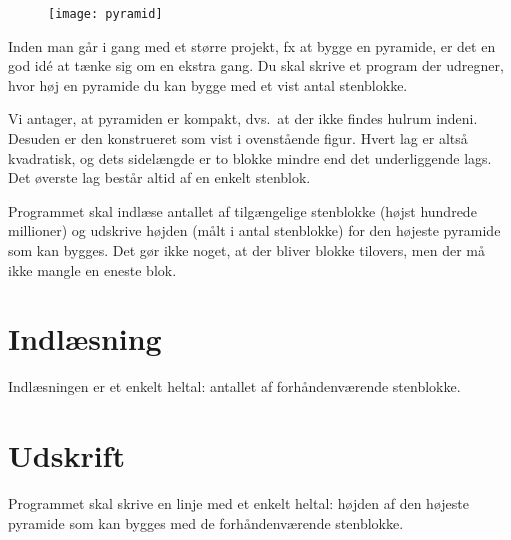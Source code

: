 
\begin{figure}[h!]
  \centering
  \texttt{[image: pyramid]}
\end{figure}

Inden man går i gang med et større projekt, fx at bygge en pyramide, er det en god idé at tænke sig om en ekstra gang.
Du skal skrive et program der udregner, hvor høj en pyramide du kan bygge med et vist antal stenblokke.

Vi antager, at pyramiden er kompakt, dvs.\ at der ikke findes hulrum indeni.
Desuden er den konstrueret som vist i ovenstående figur.
Hvert lag er altså kvadratisk, og dets sidelængde er to blokke mindre end det underliggende lags.
Det øverste lag består altid af en enkelt stenblok.

Programmet skal indlæse antallet af tilgængelige stenblokke (højst hundrede millioner) og udskrive højden (målt i antal stenblokke) for den højeste pyramide som kan bygges.
Det gør ikke noget, at der bliver blokke tilovers, men der må ikke mangle en eneste blok.

\section*{Indlæsning}
Indlæsningen er et enkelt heltal: antallet af forhåndenværende stenblokke.

\section*{Udskrift}
Programmet skal skrive en linje med et enkelt heltal: højden af den højeste pyramide som kan bygges med de forhåndenværende stenblokke.
